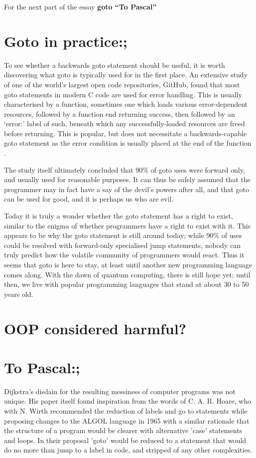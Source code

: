 \documentclass{journal}
\begin{document}
For the next part of the essay \textbf{goto ``To Pascal''}

\section{Goto in practice:;}
To see whether a backwards goto statement should be useful, it is worth discovering what goto is typically used for in the first place. An extensive study \cite{gotostudy} of one of the world's largest open code repositories, GitHub, found that most goto statements in modern C code are used for error handling. This is usually characterised by a function, sometimes one which loads various error-dependent resources, followed by a function end returning success, then followed by an `error:' label of such, beneath which any successfully-loaded resources are freed before returning. This is popular, but does not necessitate a backwards-capable goto statement as the error condition is usually placed at the end of the function \cite{gotostudy}.

The study itself ultimately concluded that 90\% of goto uses were forward only, and usually used for reasonable purposes. It can thus be safely assumed that the programmer may in fact have a say of the devil's powers after all, and that goto can be used for good, and it is perhaps us who are evil.

Today it is truly a wonder whether the goto statement has a right to exist, similar to the enigma of whether programmers have a right to exist with it. This appears to be why the goto statement is still around today; while 90\% of uses could be resolved with forward-only specialised jump statements, nobody can truly predict how the volatile community of programmers would react. Thus it seems that goto is here to stay, at least until another new programming language comes along. With the dawn of quantum computing, there is still hope yet; until then, we live with popular programming languages that stand at about 30 to 50 years old.

\section{OOP considered harmful?}

\section{To Pascal:;}
Dijkstra's disdain for the resulting messiness of computer programs was not unique. His paper itself found inspiration from the words of C. A. R. Hoare, who with N. Wirth \cite{algolwirth} recommended the reduction of labels and go to statements while proposing changes to the ALGOL language in 1965 with a similar rationale that the structure of a program would be clearer with alternative 'case' statements and loops. In their proposal 'goto' would be reduced to a statement that would do no more than jump to a label in code, and stripped of any other complexities.
\end{document}
